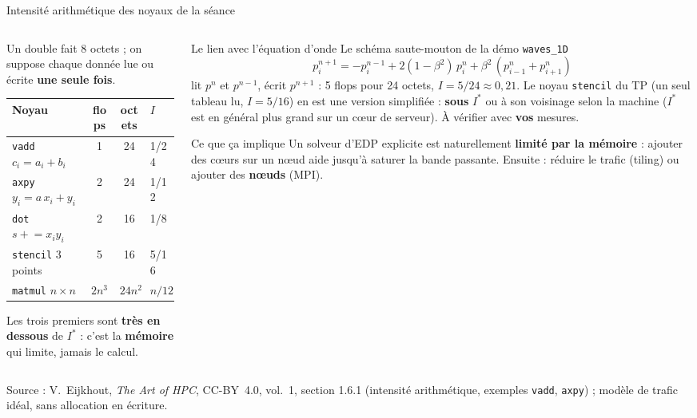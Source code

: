 \documentclass[8pt,aspectratio=169]{beamer}
\newcommand{\src}[1]{\vfill{\tiny\color{gray}Source : #1\par}}
\newcommand{\eij}{V.~Eijkhout, \emph{The Art of HPC}, CC-BY~4.0}
\begin{document}
\begin{frame}{Intensité arithmétique des noyaux de la séance}
\begin{columns}[T]
\begin{column}{0.56\textwidth}
Un double fait 8 octets ; on suppose chaque donnée lue ou écrite \textbf{une seule fois}.

\smallskip
\begin{tabular}{@{}L{3.4cm}ccL{1.0cm}@{}}
\toprule
\textbf{Noyau} & \textbf{flops} & \textbf{octets} & $I$\\
\midrule
\texttt{vadd} $c_i=a_i+b_i$ & 1 & 24 & 1/24\\
\texttt{axpy} $y_i=a\,x_i+y_i$ & 2 & 24 & 1/12\\
\texttt{dot} $s\mathrel{+}=x_i y_i$ & 2 & 16 & 1/8\\
\texttt{stencil} 3 points & 5 & 16 & 5/16\\
\texttt{matmul} $n\times n$ & $2n^3$ & $24n^2$ & $n/12$\\
\bottomrule
\end{tabular}

\medskip
Les trois premiers sont \textbf{très en dessous} de $I^*$ : c'est la \textbf{mémoire} qui limite, jamais le calcul.
\end{column}
\begin{column}{0.42\textwidth}
\begin{exampleblock}{Le lien avec l'équation d'onde}
Le schéma saute-mouton de la démo \texttt{waves\_1D}
\[
p_i^{n+1} = -p_i^{n-1} + 2(1-\beta^2)\,p_i^{n} + \beta^2\,(p_{i-1}^{n}+p_{i+1}^{n})
\]
lit $p^n$ et $p^{n-1}$, écrit $p^{n+1}$ : 5 flops pour 24 octets, $I = 5/24 \approx 0{,}21$. Le noyau \texttt{stencil} du TP (un seul tableau lu, $I=5/16$) en est une version simplifiée : \textbf{sous} $I^*$ ou à son voisinage selon la machine ($I^*$ est en général plus grand sur un cœur de serveur). À vérifier avec \textbf{vos} mesures.
\end{exampleblock}
\begin{alertblock}{Ce que ça implique}
Un solveur d'EDP explicite est naturellement \textbf{limité par la mémoire} : ajouter des cœurs sur un nœud aide jusqu'à saturer la bande passante. Ensuite : réduire le trafic (tiling) ou ajouter des \textbf{nœuds} (MPI).
\end{alertblock}
\end{column}
\end{columns}
\src{\eij{}, vol.~1, section 1.6.1 (intensité arithmétique, exemples \texttt{vadd}, \texttt{axpy}) ; modèle de trafic idéal, sans allocation en écriture.}
\end{frame}
\end{document}
